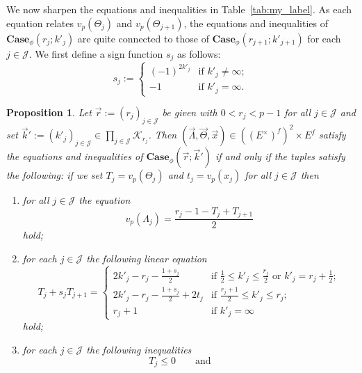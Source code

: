 \documentclass[11pt]{amsart}
\theoremstyle{definition}
\numberwithin{equation}{subsection}
\theoremstyle{plain}
\theoremstyle{plain}
\theoremstyle{plain}
\theoremstyle{plain}
\theoremstyle{plain}
\theoremstyle{plain}
\theoremstyle{plain}
\theoremstyle{plain}
\newtheorem{prop}[equation]{Proposition}
\theoremstyle{plain}
\theoremstyle{plain}
\theoremstyle{plain}
\theoremstyle{plain}
\theoremstyle{definition}
\theoremstyle{definition}
\theoremstyle{definition}
\theoremstyle{remark}
\renewcommand{\(}{\textup{(}}
\renewcommand{\)}{\textup{)}}
\newcommand{\cJ}{\mathcal{J}}
\newcommand{\vx}{\vec{x}}
\newcommand{\vr}{\vec{r}}
\newcommand{\vk}{\vec{k}}
\newcommand{\cK}{\mathcal{K}}
\newcommand{\vLam}{\vec{\Lambda}}
\newcommand{\vTh}{\vec{\Theta}}
\begin{document}
We now sharpen the equations and inequalities in Table~\ref{tab:my_label}. As each equation relates $v_p(\Theta_j)$ and $v_p(\Theta_{j+1})$, the equations and inequalities of $\mathbf{Case}_\phi(r_j;k'_j)$ are quite connected to those of $\mathbf{Case}_\phi(r_{j+1};k'_{j+1})$ for each $j\in\cJ$. We first define a sign function $s_j$ as follows:
\begin{equation*}
s_j:=
\begin{cases}
   (-1)^{2k'_j} & \mbox{if } k'_j\neq\infty; \\
   -1 & \mbox{if } k'_j=\infty.
\end{cases}
\end{equation*}

\begin{prop}\label{prop: system of equations and inequalities sharpened}
Let $\vr:=(r_j)_{j\in\cJ}$ be given with $0<r_j<p-1$ for all $j\in\cJ$ and set $\vk':=(k'_j)_{j\in\cJ}\in \prod_{j\in\cJ}\cK_{r_j}$. Then $(\vLam,\vTh,\vx)\in ((E^\times)^f)^{2}\times E^f$ satisfy the equations and inequalities of $\mathbf{Case}_\phi(\vr;\vk')$ if and only if the tuples satisfy the following: if we set $T_j=v_p(\Theta_j)$ and $t_j=v_p(x_j)$ for all $j\in\cJ$ then
\begin{enumerate}[leftmargin=*]
\item for all $j\in\cJ$ the equation
     \begin{equation}\label{eq: valuation of Lambda}
     v_p(\Lambda_j)=\frac{r_j-1-T_j+T_{j+1}}{2}
     \end{equation}
     hold;
\item for each $j\in\cJ$ the following linear equation
        \begin{equation}\label{eq: system of equations sharpened}
            T_j+s_jT_{j+1}
            =
            \begin{cases}
                2k'_j-r_j-\frac{1+s_j}{2} & \mbox{if } \frac{1}{2}\leq k'_j\leq \frac{r_j}{2}\,\,\mbox{or}\,\,k'_j=r_j+\frac{1}{2};\\
                2k'_j-r_j-\frac{1+s_j}{2}+2t_j  & \mbox{if } \frac{r_j+1}{2}\leq k'_j\leq r_j;\\
                r_j+1 & \mbox{if } k'_j=\infty
            \end{cases}
        \end{equation}
hold;
\item for each $j\in\cJ$ the following inequalities
        \begin{equation}\label{eq: system of inequailties sharpened}
            T_j\leq 0\qquad\mbox{and}\qquad

\end{equation}
\end{enumerate}
\end{prop}
\end{document}
